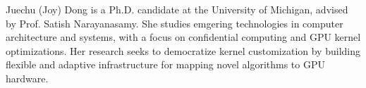 Juechu (Joy) Dong is a Ph.D. candidate at the University of Michigan, advised by Prof. Satish Narayanasamy. 
She studies emgering technologies in computer architecture and systems, with a focus on confidential computing and GPU kernel optimizations. Her research seeks to democratize kernel customization by building flexible and adaptive infrastructure for mapping novel algorithms to GPU hardware.